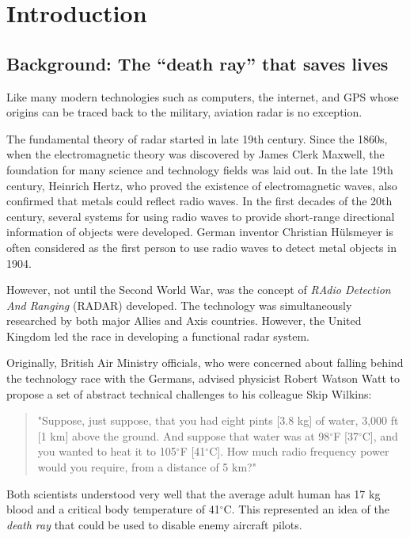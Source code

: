 \chapter{Introduction} \label{chap:intro}

\section{Background: The ``death ray'' that saves lives}

Like many modern technologies such as computers, the internet, and GPS whose origins can be traced back to the military, aviation radar is no exception. 

The fundamental theory of radar started in late 19th century. Since the 1860s, when the electromagnetic theory was discovered by James Clerk Maxwell, the foundation for many science and technology fields was laid out. In the late 19th century, Heinrich Hertz, who proved the existence of electromagnetic waves, also confirmed that metals could reflect radio waves. In the first decades of the 20th century, several systems for using radio waves to provide short-range directional information of objects were developed. German inventor 
Christian H\"ulsmeyer is often considered as the first person to use radio waves to detect metal objects in 1904.

However, not until the Second World War, was the concept of \emph{RAdio Detection And Ranging} (RADAR) developed. The technology was simultaneously researched by both major Allies and Axis countries. However, the United Kingdom led the race in developing a functional radar system. 

Originally, British Air Ministry officials, who were concerned about falling behind the technology race with the Germans, advised physicist Robert Watson Watt to propose a set of abstract technical challenges to his colleague Skip Wilkins:

\begin{quotation}
\noindent"Suppose, just suppose, that you had eight pints [3.8 kg] of water, 3,000 ft [1 km] above the ground. And suppose that water was at 98$^\circ$F [37$^\circ$C], and you wanted to heat it to 105$^\circ$F [41$^\circ$C]. How much radio frequency power would you require, from a distance of 5 km?"
\end{quotation}

Both scientists understood very well that the average adult human has 17 kg blood and a critical body temperature of 41$^\circ$C. This represented an idea of the \emph{death ray} that could be used to disable enemy aircraft pilots.

